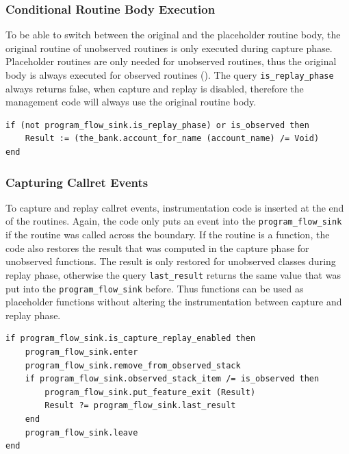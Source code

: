 \subsubsection{Conditional Routine Body Execution}
To be able to switch between the original and the placeholder routine body, the original routine of unobserved routines is only executed during capture phase. Placeholder routines are only needed for unobserved routines, thus the original body is always executed for observed routines (). The query \texttt{is\_replay\_phase} always returns false, when capture and replay is disabled, therefore the management code will always use the original routine body.

\begin{lstlisting}[caption=Conditional Methodbody,label=lst:methodbody_instrumentation]
if (not program_flow_sink.is_replay_phase) or is_observed then
	Result := (the_bank.account_for_name (account_name) /= Void)
end
\end{lstlisting}
\subsubsection{Capturing Callret Events}
To capture and replay callret events, instrumentation code is inserted at the end of the routines. Again, the code only puts an event into the \texttt{program\_flow\_sink} if the routine was called across the boundary. If the routine is a function, the code also restores the result that was computed in the capture phase for unobserved functions. The result is only restored for unobserved classes during replay phase, otherwise the query \texttt{last\_result} returns the same value that was put into the \texttt{program\_flow\_sink} before. Thus functions can be used as placeholder functions without altering the instrumentation between capture and replay phase.
\begin{lstlisting}[caption=Instrumentation to Capture Callret Events,label=lst:exit_instrumentation]
if program_flow_sink.is_capture_replay_enabled then
	program_flow_sink.enter
	program_flow_sink.remove_from_observed_stack
	if program_flow_sink.observed_stack_item /= is_observed then
		program_flow_sink.put_feature_exit (Result)
		Result ?= program_flow_sink.last_result
	end
	program_flow_sink.leave
end
\end{lstlisting}

